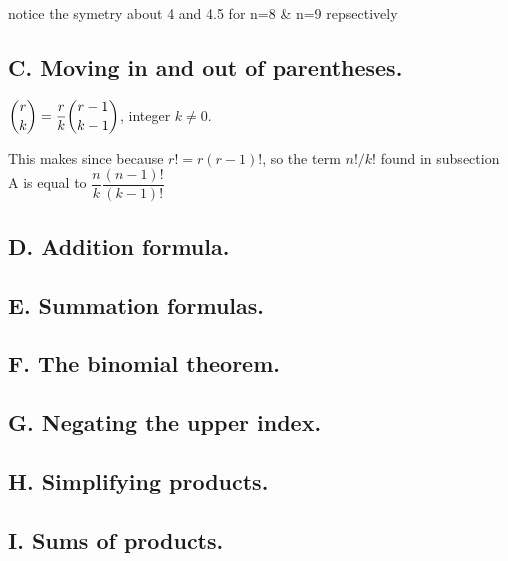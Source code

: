 \documentclass{article}
\begin{document}
  notice the symetry about 4 and 4.5 for n=8 & n=9 repsectively

\subsection*{C. Moving in and out of parentheses.}
\begin{center}
$\dbinom{r}{k} = \dfrac{r}{k}\dbinom{r-1}{k-1}$, integer $k \neq 0$.
\end{center}
This makes since because $r! = r(r-1)!$, so the term $n!/k!$ found in subsection A is
equal to $\dfrac{n}{k}\dfrac{(n-1)!}{(k-1)!}$

\subsection*{D. Addition formula.}
\subsection*{E. Summation formulas.}
\subsection*{F. The binomial theorem.}
\subsection*{G. Negating the upper index.}
\subsection*{H. Simplifying products.}
\subsection*{I. Sums of products.}
\end{document}

